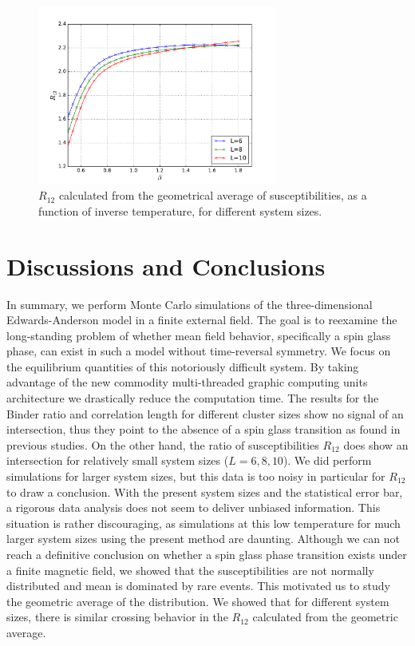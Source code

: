 \begin{figure}[ht]
  \centering
  \includegraphics[width=0.7\textwidth]{img/r12_gmean_h01.pdf}
\caption{\label{fig:r12_gmean} $R_{12}$ calculated from the geometrical average
of susceptibilities, 
as a function of inverse temperature, for different system sizes. 
}
\end{figure}


\section{Discussions and Conclusions}
In summary, we perform Monte Carlo simulations of the three-dimensional
Edwards-Anderson model in a finite external field. The goal is to reexamine the 
long-standing problem of whether mean field behavior, specifically a spin glass phase, can
exist in such a model without time-reversal symmetry. We focus on the equilibrium quantities
of this notoriously difficult system. By taking advantage of the new commodity multi-threaded 
graphic computing units architecture we drastically reduce the computation time. The results 
for the Binder ratio and correlation length for different cluster sizes show no signal of an 
intersection, thus they point to the absence of a spin glass transition
as found in  previous studies. On the other hand, the ratio of susceptibilities 
$R_{12}$ does show an intersection for relatively small system sizes ($L=6,8,10$). 
We did perform simulations for larger system sizes, but this data 
is too noisy in particular for $R_{12}$ to draw a conclusion.
With the present system sizes and the statistical error bar, a rigorous data 
analysis does not seem to deliver unbiased information. 
This situation is rather discouraging, as simulations at this low temperature 
for much larger system sizes using the present method are daunting. 
Although we can not reach a definitive conclusion on whether a spin glass phase 
transition exists under a finite magnetic field,
we showed that the susceptibilities are not normally distributed and mean is 
dominated by rare events.
This motivated us to study the geometric average of the distribution. 
We showed that for different system sizes, there is similar crossing behavior 
in the $R_{12}$ calculated from the geometric average. 



